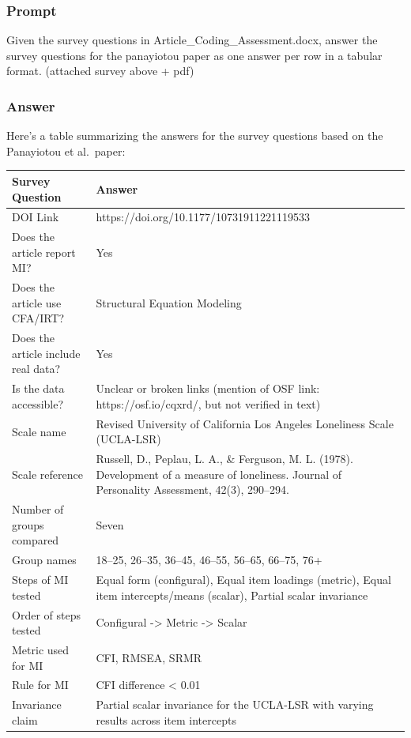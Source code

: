 \documentclass[
  man]{apa7}
\begin{document}
\subsubsection{Prompt}\label{prompt}

Given the survey questions in Article\_Coding\_Assessment.docx, answer the survey questions for the panayiotou paper as one answer per row in a tabular format. (attached survey above + pdf)

\subsubsection{Answer}\label{answer}

Here's a table summarizing the answers for the survey questions based on the Panayiotou et al.~paper:

\begin{tabular}{l|l}
\hline
Survey Question & Answer\\
\hline
DOI Link & https://doi.org/10.1177/10731911221119533\\
\hline
Does the article report MI? & Yes\\
\hline
Does the article use CFA/IRT? & Structural Equation Modeling\\
\hline
Does the article include real data? & Yes\\
\hline
Is the data accessible? & Unclear or broken links (mention of OSF link: https://osf.io/cqxrd/, but not verified in text)\\
\hline
Scale name & Revised University of California Los Angeles Loneliness Scale (UCLA-LSR)\\
\hline
Scale reference & Russell, D., Peplau, L. A., \& Ferguson, M. L. (1978). Development of a measure of loneliness. Journal of Personality Assessment, 42(3), 290–294.\\
\hline
Number of groups compared & Seven\\
\hline
Group names & 18–25, 26–35, 36–45, 46–55, 56–65, 66–75, 76+\\
\hline
Steps of MI tested & Equal form (configural), Equal item loadings (metric), Equal item intercepts/means (scalar), Partial scalar invariance\\
\hline
Order of steps tested & Configural -> Metric -> Scalar\\
\hline
Metric used for MI & CFI, RMSEA, SRMR\\
\hline
Rule for MI & CFI difference < 0.01\\
\hline
Invariance claim & Partial scalar invariance for the UCLA-LSR with varying results across item intercepts\\
\hline
\end{tabular}
\end{document}
